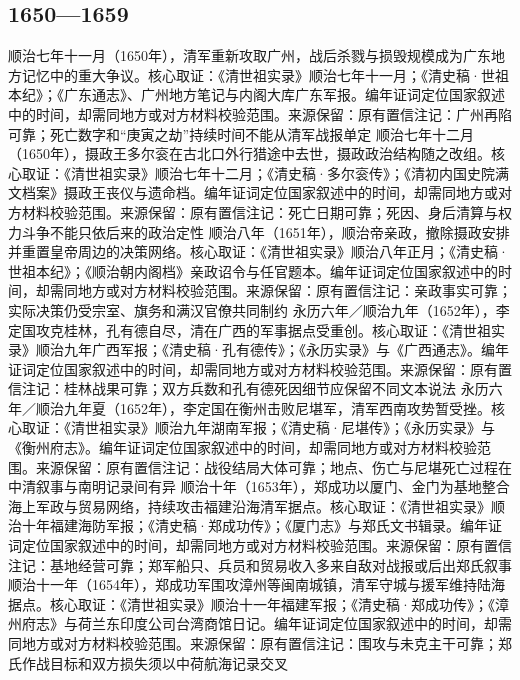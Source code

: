 \subsection{1650—1659}
顺治七年十一月（1650年），清军重新攻取广州，战后杀戮与损毁规模成为广东地方记忆中的重大争议。核心取证：《清世祖实录》顺治七年十一月；《清史稿·世祖本纪》；《广东通志》、广州地方笔记与内阁大库广东军报。编年证词定位国家叙述中的时间，却需同地方或对方材料校验范围。来源保留：原有置信注记：广州再陷可靠；死亡数字和“庚寅之劫”持续时间不能从清军战报单定
顺治七年十二月（1650年），摄政王多尔衮在古北口外行猎途中去世，摄政政治结构随之改组。核心取证：《清世祖实录》顺治七年十二月；《清史稿·多尔衮传》；《清初内国史院满文档案》摄政王丧仪与遗命档。编年证词定位国家叙述中的时间，却需同地方或对方材料校验范围。来源保留：原有置信注记：死亡日期可靠；死因、身后清算与权力斗争不能只依后来的政治定性
顺治八年（1651年），顺治帝亲政，撤除摄政安排并重置皇帝周边的决策网络。核心取证：《清世祖实录》顺治八年正月；《清史稿·世祖本纪》；《顺治朝内阁档》亲政诏令与任官题本。编年证词定位国家叙述中的时间，却需同地方或对方材料校验范围。来源保留：原有置信注记：亲政事实可靠；实际决策仍受宗室、旗务和满汉官僚共同制约
永历六年／顺治九年（1652年），李定国攻克桂林，孔有德自尽，清在广西的军事据点受重创。核心取证：《清世祖实录》顺治九年广西军报；《清史稿·孔有德传》；《永历实录》与《广西通志》。编年证词定位国家叙述中的时间，却需同地方或对方材料校验范围。来源保留：原有置信注记：桂林战果可靠；双方兵数和孔有德死因细节应保留不同文本说法
永历六年／顺治九年夏（1652年），李定国在衡州击败尼堪军，清军西南攻势暂受挫。核心取证：《清世祖实录》顺治九年湖南军报；《清史稿·尼堪传》；《永历实录》与《衡州府志》。编年证词定位国家叙述中的时间，却需同地方或对方材料校验范围。来源保留：原有置信注记：战役结局大体可靠；地点、伤亡与尼堪死亡过程在中清叙事与南明记录间有异
顺治十年（1653年），郑成功以厦门、金门为基地整合海上军政与贸易网络，持续攻击福建沿海清军据点。核心取证：《清世祖实录》顺治十年福建海防军报；《清史稿·郑成功传》；《厦门志》与郑氏文书辑录。编年证词定位国家叙述中的时间，却需同地方或对方材料校验范围。来源保留：原有置信注记：基地经营可靠；郑军船只、兵员和贸易收入多来自敌对战报或后出郑氏叙事
顺治十一年（1654年），郑成功军围攻漳州等闽南城镇，清军守城与援军维持陆海据点。核心取证：《清世祖实录》顺治十一年福建军报；《清史稿·郑成功传》；《漳州府志》与荷兰东印度公司台湾商馆日记。编年证词定位国家叙述中的时间，却需同地方或对方材料校验范围。来源保留：原有置信注记：围攻与未克主干可靠；郑氏作战目标和双方损失须以中荷航海记录交叉
